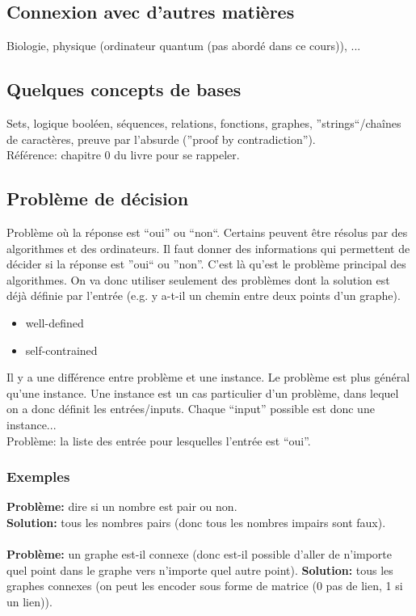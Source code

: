 \documentclass[a4paper,12pt]{article}
\begin{document}
  \subsection{Connexion avec d'autres matières}
    Biologie, physique (ordinateur quantum (pas abordé dans ce cours)), ...

  \subsection{Quelques concepts de bases}
    Sets, logique booléen, séquences, relations, fonctions, graphes, ''strings``/chaînes de caractères, preuve par l'absurde (''proof by contradiction'').\\
    Référence: chapitre 0 du livre pour se rappeler.

  \subsection{Problème de décision}
    Problème où la réponse est ``oui'' ou ``non``.  Certains peuvent être résolus par des algorithmes et des ordinateurs.  Il faut donner des informations qui permettent de décider si la réponse est ''oui`` ou ''non''.  C'est là qu'est le problème principal des algorithmes.  On va donc utiliser seulement des problèmes dont la solution est déjà définie par l'entrée (e.g. y a-t-il un chemin entre deux points d'un graphe).\\
    \begin{itemize}
     \item well-defined
     \item self-contrained
    \end{itemize}
    Il y a une différence entre problème et une instance.  Le problème est plus général qu'une instance.  Une instance est un cas particulier d'un problème, dans lequel on a donc définit les entrées/inputs.  Chaque ``input'' possible est donc une instance...\\
    Problème: la liste des entrée pour lesquelles l'entrée est ``oui''.

    \subsubsection{Exemples}
      \textbf{Problème:} dire si un nombre est pair ou non.\\
      \textbf{Solution:} tous les nombres pairs (donc tous les nombres impairs sont faux).\\
      \\
      \textbf{Problème:} un graphe est-il connexe (donc est-il possible d'aller de n'importe quel point dans le graphe vers n'importe quel autre point).
      \textbf{Solution:} tous les graphes connexes (on peut les encoder sous forme de matrice (0 pas de lien, 1 si un lien)).
\end{document}
